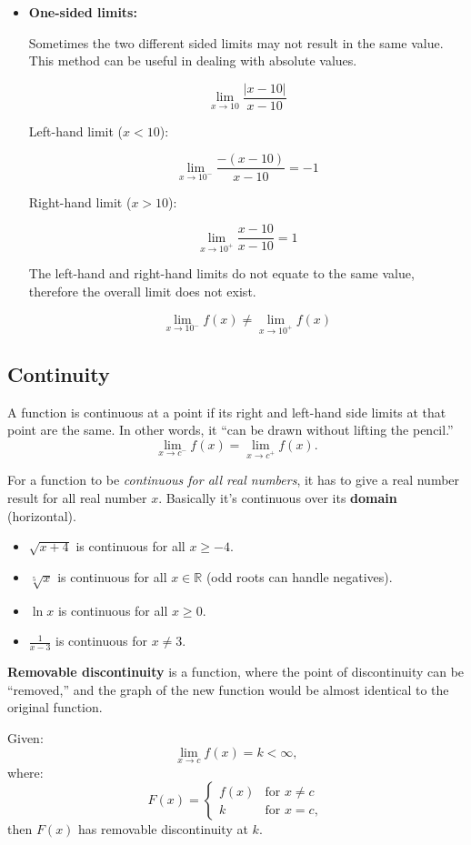 \documentclass[12pt]{article}
\begin{document}
\begin{itemize}
    \item \textbf{One-sided limits:}

    Sometimes the two different sided limits may not result in the same value. This method can be useful in dealing with absolute values.

    \[ \lim_{x \to 10} \frac{|x - 10|}{x - 10} \]

    Left-hand limit ($x < 10$):

    \[ \lim_{x \to 10^-} \frac{-(x - 10)}{x - 10} = -1 \]

    Right-hand limit ($x > 10$):

    \[ \lim_{x \to 10^+} \frac{x - 10}{x - 10} = 1 \]

    The left-hand and right-hand limits do not equate to the same value, therefore the overall limit does not exist.

    \[ \lim_{x \to 10^-} f(x) \neq \lim_{x \to 10^+} f(x) \]
\end{itemize}

\subsection{Continuity}
A function is continuous at a point if its right and left-hand side limits at that point are the same. In other words, it ``can be drawn without lifting the pencil.''
\[ \lim_{x \to c^-} f(x) = \lim_{x \to c^+} f(x).\]

For a function to be \textit{continuous for all real numbers}, it has to give a real number result for all real number $x$. Basically it's continuous over its \textbf{domain} (horizontal).

\begin{itemize}
    \item $\sqrt{x+4}$ is continuous for all $x \ge -4$.
    \item $\sqrt[5]{x}$ is continuous for all $x \in \mathbb{R}$ (odd roots can handle negatives).
    \item $\ln{x}$ is continuous for all $x \ge 0$.
    \item $\frac{1}{x-3}$ is continuous for $x \ne 3$.
\end{itemize}

\textbf{Removable discontinuity} is a function, where the point of discontinuity can be ``removed,'' and the graph of the new function would be almost identical to the original function.

\noindent Given:
\[ \lim_{x \to c} f(x) = k < \infty, \]
where:
\[ F(x) = \begin{cases}
        f(x) & \text{for } x \ne c \\
        k    & \text{for } x = c,
    \end{cases} \]
then $F(x)$ has removable discontinuity at $k$.
\end{document}
